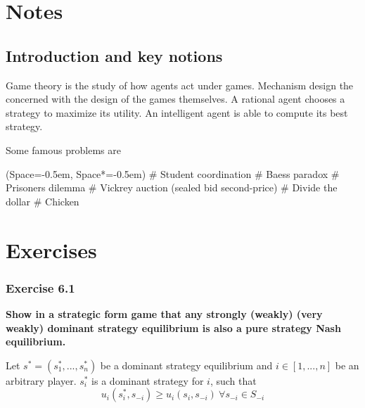 \documentclass[12pt, a4paper]{article}
\title{\Title}
\author{\Author}
\date{Last updated \today.}
\newcommand{\listSpace}{-0.5em}%
\begin{document}
	\maketitle
	\begin{abstract}
		\noindent 
		This document contains notes on game theory and mechanism design.
	\end{abstract}
	
	{\small \tableofcontents}
	
	
	\clearpage
	
	\section{Notes}
	
	
	\subsection{Introduction and key notions}
	
	Game theory is the study of how agents act under games.
	Mechanism design the concerned with the design of the games themselves.
	A rational agent chooses a strategy to maximize its utility.
	An intelligent agent is able to compute its best strategy.
	
	Some famous problems are
	\begin{easylist}[itemize]
		\ListProperties(Space=\listSpace, Space*=\listSpace)
		# Student coordination
		# Baess paradox
		# Prisoners dilemma
		# Vickrey auction (sealed bid second-price)
		# Divide the dollar
		# Chicken
	\end{easylist}
	
	
	\clearpage
	\section{Exercises}
	
	\subsubsection*{Exercise 6.1}
	\textbf{Show in a strategic form game that any strongly (weakly) (very weakly) dominant strategy equilibrium is also a pure strategy Nash equilibrium.}
	
	Let $s^* = (s_1^*, ..., s_n^*)$ be a dominant strategy equilibrium and $i\in [1,...,n]$ be an arbitrary player. $s_i^*$ is a dominant strategy for $i$, such that
	\[ u_i(s_i^*, s_{-i}) \geq u_i(s_i,s_{-i})\ \forall s_{-i}\in S_{-i} \]
	
\end{document}

